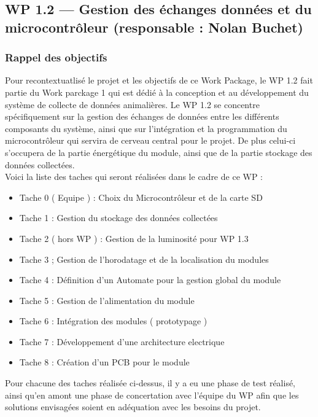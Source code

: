 


\subsection{WP 1.2 — Gestion des échanges données et du microcontrôleur (responsable : Nolan Buchet)}

\subsubsection{Rappel des objectifs}

Pour recontextuatlisé le projet et les objectifs de ce Work Package, le WP 1.2 fait partie du Work parckage 1 qui 
est dédié à la conception et au développement du système de collecte de données animalières. Le WP 1.2 se concentre 
spécifiquement sur la gestion des échanges de données entre les différents composants du système, ainsi que sur 
l'intégration et la programmation du microcontrôleur qui servira de cerveau central pour le projet. De plus celui-ci 
s'occupera de la partie énergétique du module, ainsi que de la partie stockage des données collectées.
\\

Voici la liste des taches qui seront réalisées dans le cadre de ce WP :
\begin{itemize}
    \item Tache 0 ( Equipe ) : Choix du Microcontrôleur et de la carte SD
    \item Tache 1 : Gestion du stockage des données collectées
    \item Tache 2 ( hors WP ) : Gestion de la luminosité pour WP 1.3
    \item Tache 3 ; Gestion de l'horodatage et de la localisation du modules
    \item Tache 4 : Définition d'un Automate pour la gestion global du module
    \item Tache 5 : Gestion de l'alimentation du module
    \item Tache 6 : Intégration des modules ( prototypage )
    \item Tache 7 : Développement d'une architecture electrique
    \item Tache 8 : Création d'un PCB pour le module
    \\
\end{itemize}

Pour chacune des taches réalisée ci-dessus, il y a eu une phase de test réalisé, ainsi qu'en amont une phase de concertation avec 
l'équipe du WP afin que les solutions envisagées soient en adéquation avec les besoins du projet.
\\

